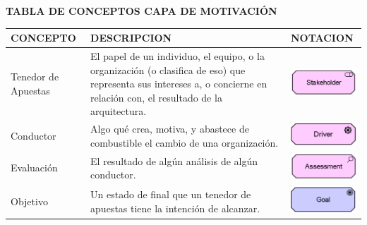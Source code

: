 \begin{table}[H]
	\centering\textbf{TABLA DE CONCEPTOS CAPA DE MOTIVACIÓN}
	\centering
	\begin{tabular}{| m{4cm} | m{4cm} | m{4cm} | }
		\hline
		\centering\vspace{1.52mm}CONCEPTO & \centering\vspace{1.52mm}DESCRIPCION &\vspace{1.52mm}NOTACION \\
		\hline
		\centering\vspace{1.52mm}Tenedor de Apuestas& \vspace{1.52mm}El papel de un individuo, el equipo, o la organización (o clasifica de eso) que representa sus intereses a, o concierne en relación con, el resultado de la arquitectura.& \vspace{1.52mm}\includegraphics[width=30mm]{arquitectura/imagenes/51} \\
		\hline
		\centering\vspace{1.52mm}Conductor& \vspace{1.52mm}Algo qué crea, motiva, y abastece de combustible el cambio de una organización.& \vspace{1.52mm}\includegraphics[width=30mm]{arquitectura/imagenes/52} \\
		\hline
		\centering\vspace{1.52mm}Evaluación& \vspace{1.52mm}El resultado de algún análisis de algún conductor.& \vspace{1.52mm}\includegraphics[width=30mm]{arquitectura/imagenes/53} \\
		\hline
		\centering\vspace{1.52mm}Objetivo& \vspace{1.52mm}Un estado de final que un tenedor de apuestas tiene la intención de alcanzar.& \vspace{1.52mm}\includegraphics[width=30mm]{arquitectura/imagenes/54} \\

\end{tabular}
\end{table}
